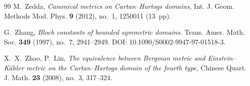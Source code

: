 \documentclass[reqno, 11pt]{amsart}
\begin{document}
\begin{thebibliography}{99}
M.~Zedda,
\emph{Canonical metrics on Cartan--Hartogs domains},
Int. J. Geom. Methods Mod. Phys. \textbf{9} (2012), no.~1, 1250011 (13~pp).

\label{ZHANG1997ConstantOfBSD}
G.~Zhang, \textit{Bloch constants of bounded symmetric domains}. Trans. Amer. Math. Soc. \textbf{349} (1997), no.~7, 2941--2949. DOI: 10.1090/S0002-9947-97-01518-3.


X.~X.~Zhao, P.~Lin,
\emph{The equivalence between Bergman metric and Einstein--K\"ahler metric on the Cartan--Hartogs domain of the fourth type},
Chinese Quart. J. Math. \textbf{23} (2008), no.~3, 317--324.


\end{thebibliography}
\end{document}
